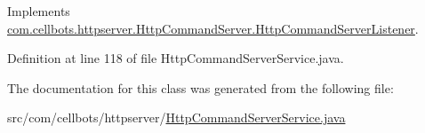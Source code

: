 Implements \hyperlink{interfacecom_1_1cellbots_1_1httpserver_1_1_http_command_server_1_1_http_command_server_listener_a02b6e1dc1f2144f0a56b6a174bde5f0e}{com.\-cellbots.\-httpserver.\-Http\-Command\-Server.\-Http\-Command\-Server\-Listener}.



Definition at line 118 of file Http\-Command\-Server\-Service.\-java.



The documentation for this class was generated from the following file\-:\begin{DoxyCompactItemize}
\item 
src/com/cellbots/httpserver/\hyperlink{_http_command_server_service_8java}{Http\-Command\-Server\-Service.\-java}\end{DoxyCompactItemize}
